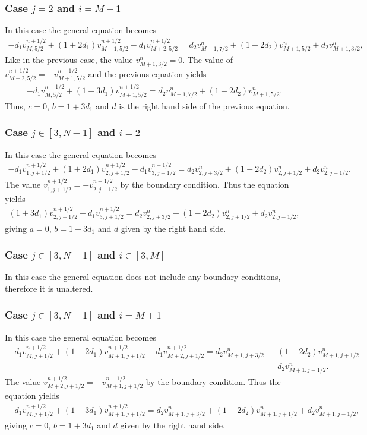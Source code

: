 \subsubsection*{Case $j=2$ and $i=M+1$}
In this case the general equation becomes
\begin{align*}
-d_1v_{M,5/2}^{n+1/2}+(1+2d_1)v_{M+1,5/2}^{n+1/2}-d_1v_{M+2,5/2}^{n+1/2}=d_2v_{M+1,7/2}^{n}+(1-2d_2)v_{M+1,5/2}^{n}+d_2v_{M+1,3/2}^{n},
\end{align*}
Like in the previous case, the value $v_{M+1,3/2}^{n}=0$. The value of $v_{M+2,5/2}^{n+1/2}=-v_{M+1,5/2}^{n+1/2}$ and the previous equation yields
\begin{align*}
-d_1v_{M,5/2}^{n+1/2}+(1+3d_1)v_{M+1,5/2}^{n+1/2}=d_2v_{M+1,7/2}^{n}+(1-2d_2)v_{M+1,5/2}^{n}.
\end{align*}
Thus, $c=0$, $b=1+3d_1$ and $d$ is the right hand side of the previous equation.

\subsubsection*{Case $j\in[3,N-1]$ and $i=2$}
In this case the general equation becomes
\begin{align*}
-d_1v_{1,j+1/2}^{n+1/2}+(1+2d_1)v_{2,j+1/2}^{n+1/2}-d_1v_{3,j+1/2}^{n+1/2}=d_2v_{2,j+3/2}^{n}+(1-2d_2)v_{2,j+1/2}^{n}+d_2v_{2,j-1/2}^{n}.
\end{align*}
The value $v_{1,j+1/2}^{n+1/2}=-v_{2,j+1/2}^{n+1/2}$ by the boundary condition. Thus the equation yields
\begin{align*}
(1+3d_1)v_{2,j+1/2}^{n+1/2}-d_1v_{3,j+1/2}^{n+1/2}=d_2v_{2,j+3/2}^{n}+(1-2d_2)v_{2,j+1/2}^{n}+d_2v_{2,j-1/2}^{n},
\end{align*}
giving $a=0$, $b=1+3d_1$ and $d$ given by the right hand side.

\subsubsection*{Case $j\in[3,N-1]$ and $i\in[3,M]$}
In this case the general equation does not include any boundary conditions, therefore it is unaltered.

\subsubsection*{Case $j\in[3,N-1]$ and $i=M+1$}
In this case the general equation becomes
\begin{align*}
-d_1v_{M,j+1/2}^{n+1/2}+(1+2d_1)v_{M+1,j+1/2}^{n+1/2}-d_1v_{M+2,j+1/2}^{n+1/2}=d_2v_{M+1,j+3/2}^{n}&+(1-2d_2)v_{M+1,j+1/2}^{n}\\&+d_2v_{M+1,j-1/2}^{n}.
\end{align*}
The value $v_{M+2,j+1/2}^{n+1/2}=-v_{M+1,j+1/2}^{n+1/2}$ by the boundary condition. Thus the equation yields
\begin{align*}
-d_1v_{M,j+1/2}^{n+1/2}+(1+3d_1)v_{M+1,j+1/2}^{n+1/2}=d_2v_{M+1,j+3/2}^{n}+(1-2d_2)v_{M+1,j+1/2}^{n}+d_2v_{M+1,j-1/2}^{n},
\end{align*}
giving $c=0$, $b=1+3d_1$ and $d$ given by the right hand side.

